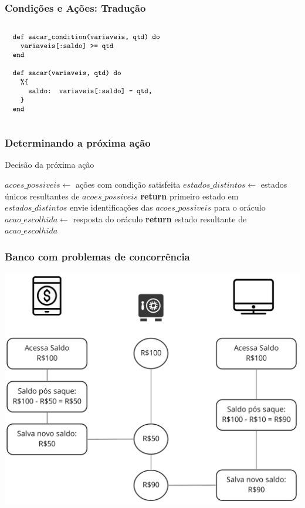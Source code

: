 \documentclass{beamer}
\begin{document}
\begin{frame}
  \frametitle{Condições e Ações: Tradução}
  $\progfig{
  ~~def sacar\_condition(variaveis, qtd) do\\
  ~~~~variaveis[:saldo] >= qtd\\
  ~~end\\\\
  ~~def sacar(variaveis, qtd) do\\
  ~~~~\%\{\\
  ~~~~~~saldo: variaveis[:saldo] - qtd,\\
  ~~~~\}\\
  ~~end
  }$
\end{frame}

\begin{frame}
  \frametitle{Determinando a próxima ação}
  \begin{algorithm}[H]
    \caption{Decisão da próxima ação}\label{alg:decide-action}
    \begin{algorithmic}[1]
      \State $acoes\_possiveis\gets$ ações com condição satisfeita
      \State $estados\_distintos\gets$ estados únicos resultantes de $acoes\_possiveis$
      \State \textbf{return} primeiro estado em $estados\_distintos$
      \Else{}
      \State envie identificações das $acoes\_possiveis$ para o oráculo
      \State $acao\_escolhida\gets$ resposta do oráculo
      \State \textbf{return} estado resultante de $acao\_escolhida$
      \EndIf
      \EndProcedure
    \end{algorithmic}
  \end{algorithm}
\end{frame}

\begin{frame}
  \frametitle{Banco com problemas de concorrência}
  \includegraphics[scale=0.15]{img/bank1.png}
\end{frame}  
\end{document}
